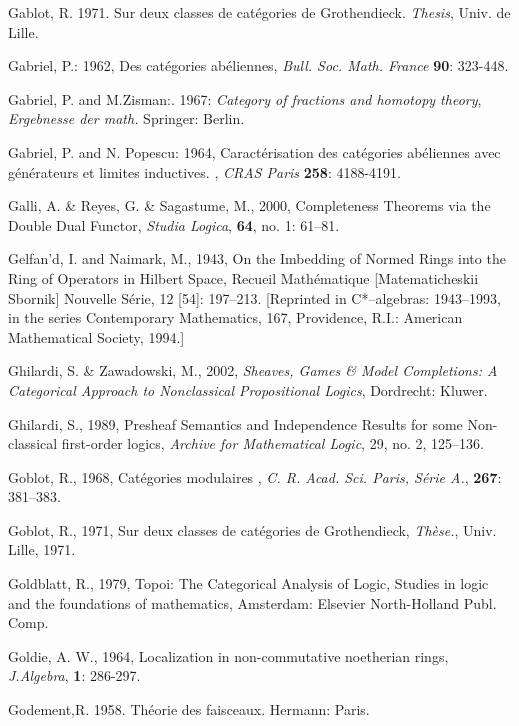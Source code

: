 \documentclass[12pt]{article}
\theoremstyle{plain}
\theoremstyle{definition}
\numberwithin{equation}{section}
\begin{document}
\begin{thebibliography}{199}
Gablot, R. 1971. Sur deux classes de cat\'{e}gories de Grothendieck. {\em Thesis},  Univ. de Lille.

Gabriel, P.: 1962, Des cat\'egories ab\'eliennes, \emph{Bull. Soc. Math. France} \textbf{90}: 323-448.

Gabriel, P. and M.Zisman:. 1967: \emph{Category of fractions and homotopy theory}, \emph{Ergebnesse der math.} Springer: Berlin.

Gabriel, P. and N. Popescu: 1964, Caract\'{e}risation des cat\'egories ab\'eliennes
avec g\'{e}n\'{e}rateurs et limites inductives. , \emph{CRAS Paris} \textbf{258}: 4188-4191.

Galli, A. \& Reyes, G. \& Sagastume, M., 2000, Completeness Theorems via the Double Dual Functor, 
{\em Studia Logica}, \textbf{64}, no. 1: 61--81. 

Gelfan'd, I. and Naimark, M., 1943, On the Imbedding of Normed Rings into the Ring of Operators in Hilbert Space, Recueil Math\'ematique [Matematicheskii Sbornik] Nouvelle S\'erie, 12 [54]: 197--213. [Reprinted in C*--algebras: 
1943--1993, in the series Contemporary Mathematics, 167,  Providence, R.I.: American Mathematical Society, 1994.] 

Ghilardi, S. \& Zawadowski, M., 2002, {\em Sheaves, Games \& Model Completions: A Categorical Approach to Nonclassical Propositional Logics}, Dordrecht: Kluwer.  

Ghilardi, S., 1989, Presheaf Semantics and Independence Results for some Non-classical first-order logics, 
{\em Archive for Mathematical Logic}, 29, no. 2, 125--136. 

Goblot, R., 1968, Cat\'egories modulaires , {\em C. R. Acad. Sci. Paris, S\'erie A.}, \textbf{267}: 381--383.

Goblot, R., 1971, Sur deux classes de cat\'egories de Grothendieck, {\em Th\`ese.}, Univ. Lille, 1971.

Goldblatt, R., 1979, Topoi: The Categorical Analysis of Logic, Studies in logic and the foundations of mathematics, Amsterdam: Elsevier North-Holland Publ. Comp. 

Goldie, A. W., 1964, Localization in non-commutative noetherian rings, {\em J.Algebra}, \textbf{1}: 286-297.

Godement,R. 1958. Th\'{e}orie des faisceaux. Hermann: Paris.


\end{thebibliography}
\end{document}
